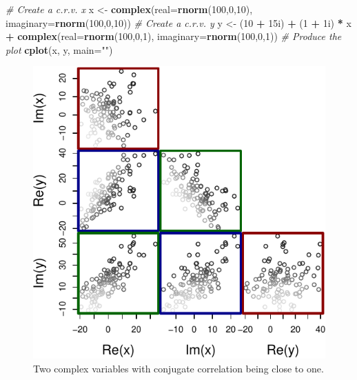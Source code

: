 \documentclass[
]{book}
\newenvironment{Shaded}{\begin{snugshade}}{\end{snugshade}}
\newcommand{\CommentTok}[1]{\textcolor[rgb]{0.56,0.35,0.01}{\textit{#1}}}
\newcommand{\DataTypeTok}[1]{\textcolor[rgb]{0.13,0.29,0.53}{#1}}
\newcommand{\DecValTok}[1]{\textcolor[rgb]{0.00,0.00,0.81}{#1}}
\newcommand{\KeywordTok}[1]{\textcolor[rgb]{0.13,0.29,0.53}{\textbf{#1}}}
\newcommand{\NormalTok}[1]{#1}
\newcommand{\OperatorTok}[1]{\textcolor[rgb]{0.81,0.36,0.00}{\textbf{#1}}}
\newcommand{\StringTok}[1]{\textcolor[rgb]{0.31,0.60,0.02}{#1}}
\begin{document}
\begin{Shaded}
\begin{Highlighting}[]
\CommentTok{\# Create a c.r.v. x}
\NormalTok{x \textless{}{-}}\StringTok{ }\KeywordTok{complex}\NormalTok{(}\DataTypeTok{real=}\KeywordTok{rnorm}\NormalTok{(}\DecValTok{100}\NormalTok{,}\DecValTok{0}\NormalTok{,}\DecValTok{10}\NormalTok{), }\DataTypeTok{imaginary=}\KeywordTok{rnorm}\NormalTok{(}\DecValTok{100}\NormalTok{,}\DecValTok{0}\NormalTok{,}\DecValTok{10}\NormalTok{))}
\CommentTok{\# Create a c.r.v. y}
\NormalTok{y \textless{}{-}}\StringTok{ }\NormalTok{(}\DecValTok{10} \OperatorTok{+}\StringTok{ }\NormalTok{15i) }\OperatorTok{+}\StringTok{ }\NormalTok{(}\DecValTok{1} \OperatorTok{+}\StringTok{ }\NormalTok{1i) }\OperatorTok{*}\StringTok{ }\NormalTok{x }\OperatorTok{+}
\StringTok{    }\KeywordTok{complex}\NormalTok{(}\DataTypeTok{real=}\KeywordTok{rnorm}\NormalTok{(}\DecValTok{100}\NormalTok{,}\DecValTok{0}\NormalTok{,}\DecValTok{1}\NormalTok{), }\DataTypeTok{imaginary=}\KeywordTok{rnorm}\NormalTok{(}\DecValTok{100}\NormalTok{,}\DecValTok{0}\NormalTok{,}\DecValTok{1}\NormalTok{))}
\CommentTok{\# Produce the plot}
\KeywordTok{cplot}\NormalTok{(x, y, }\DataTypeTok{main=}\StringTok{""}\NormalTok{)}
\end{Highlighting}
\end{Shaded}

\begin{figure}
\centering
\includegraphics{Svetunkov---Svetunkov---Complex-Valued-Econometrics_files/figure-latex/crvCorConjugate-1.pdf}
\caption{\label{fig:crvCorConjugate}Two complex variables with conjugate correlation being close to one.}
\end{figure}
\end{document}
